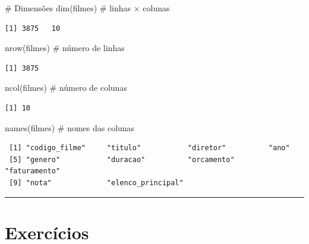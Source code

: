 \documentclass[
  letterpaper,
]{scrbook}
\newenvironment{Shaded}{\begin{snugshade}}{\end{snugshade}}
\newcommand{\CommentTok}[1]{\textcolor[rgb]{0.37,0.37,0.37}{#1}}
\newcommand{\FunctionTok}[1]{\textcolor[rgb]{0.28,0.35,0.67}{#1}}
\newcommand{\NormalTok}[1]{\textcolor[rgb]{0.00,0.23,0.31}{#1}}
\begin{document}
\begin{Shaded}
\begin{Highlighting}[]
\CommentTok{\# Dimensões}
\FunctionTok{dim}\NormalTok{(filmes)     }\CommentTok{\# linhas × colunas}
\end{Highlighting}
\end{Shaded}

\begin{verbatim}
[1] 3875   10
\end{verbatim}

\begin{Shaded}
\begin{Highlighting}[]
\FunctionTok{nrow}\NormalTok{(filmes)    }\CommentTok{\# número de linhas}
\end{Highlighting}
\end{Shaded}

\begin{verbatim}
[1] 3875
\end{verbatim}

\begin{Shaded}
\begin{Highlighting}[]
\FunctionTok{ncol}\NormalTok{(filmes)    }\CommentTok{\# número de colunas}
\end{Highlighting}
\end{Shaded}

\begin{verbatim}
[1] 10
\end{verbatim}

\begin{Shaded}
\begin{Highlighting}[]
\FunctionTok{names}\NormalTok{(filmes)   }\CommentTok{\# nomes das colunas}
\end{Highlighting}
\end{Shaded}

\begin{verbatim}
 [1] "codigo_filme"     "titulo"           "diretor"          "ano"             
 [5] "genero"           "duracao"          "orcamento"        "faturamento"     
 [9] "nota"             "elenco_principal"
\end{verbatim}

\begin{center}\rule{0.5\linewidth}{0.5pt}\end{center}

\section{Exercícios}\label{exercuxedcios-8}
\end{document}
